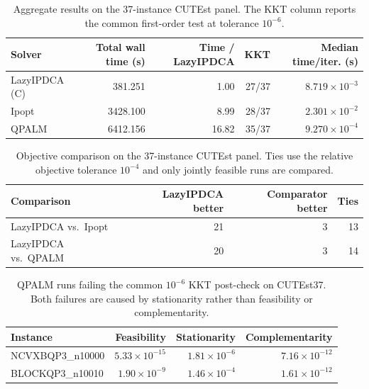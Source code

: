 
\begin{table}[t]
\centering
\caption{Aggregate results on the 37-instance CUTEst panel. The KKT column reports the common first-order test at tolerance $10^{-6}$.}
\label{tab:cutest37-aggregate}
\begin{tabular}{lrrrr}
\toprule
Solver & Total wall time (s) & Time / LazyIPDCA & KKT & Median time/iter. (s)\\
\midrule
LazyIPDCA (C) & 381.251 & 1.00 & 27/37 & $8.719\times10^{-3}$\\
Ipopt          & 3428.100 & 8.99 & 28/37 & $2.301\times10^{-2}$\\
QPALM          & 6412.156 & 16.82 & 35/37 & $9.270\times10^{-4}$\\
\bottomrule
\end{tabular}
\end{table}

\begin{table}[t]
\centering
\caption{Objective comparison on the 37-instance CUTEst panel. Ties use the relative objective tolerance $10^{-4}$ and only jointly feasible runs are compared.}
\label{tab:cutest37-objectives}
\begin{tabular}{lrrr}
\toprule
Comparison & LazyIPDCA better & Comparator better & Ties\\
\midrule
LazyIPDCA vs.\ Ipopt & 21 & 3 & 13\\
LazyIPDCA vs.\ QPALM & 20 & 3 & 14\\
\bottomrule
\end{tabular}
\end{table}

\begin{table}[t]
\centering
\caption{QPALM runs failing the common $10^{-6}$ KKT post-check on CUTEst37. Both failures are caused by stationarity rather than feasibility or complementarity.}
\label{tab:qpalm-kkt-failures}
\begin{tabular}{lrrr}
\toprule
Instance & Feasibility & Stationarity & Complementarity\\
\midrule
NCVXBQP3\_n10000 & $5.33\times10^{-15}$ & $1.81\times10^{-6}$ & $7.16\times10^{-12}$\\
BLOCKQP3\_n10010  & $1.90\times10^{-9}$  & $1.46\times10^{-4}$ & $1.61\times10^{-12}$\\
\bottomrule
\end{tabular}
\end{table}

